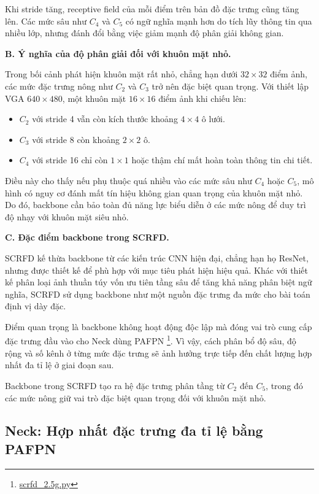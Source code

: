 Khi stride tăng, receptive field của mỗi điểm trên bản đồ đặc trưng cũng tăng lên. 
Các mức sâu như $C_4$ và $C_5$ có ngữ nghĩa mạnh hơn do tích lũy thông tin qua nhiều lớp, nhưng đánh đổi bằng việc giảm mạnh độ phân giải không gian.

\medskip
\noindent\textbf{B. Ý nghĩa của độ phân giải đối với khuôn mặt nhỏ.}

Trong bối cảnh phát hiện khuôn mặt rất nhỏ, chẳng hạn dưới $32 \times 32$ điểm ảnh, các mức đặc trưng nông như $C_2$ và $C_3$ trở nên đặc biệt quan trọng. 
Với thiết lập VGA $640 \times 480$, một khuôn mặt $16 \times 16$ điểm ảnh khi chiếu lên:

\begin{itemize}
  \item $C_2$ với stride 4 vẫn còn kích thước khoảng $4 \times 4$ ô lưới.
  \item $C_3$ với stride 8 còn khoảng $2 \times 2$ ô.
  \item $C_4$ với stride 16 chỉ còn $1 \times 1$ hoặc thậm chí mất hoàn toàn thông tin chi tiết.
\end{itemize}

Điều này cho thấy nếu phụ thuộc quá nhiều vào các mức sâu như $C_4$ hoặc $C_5$, mô hình có nguy cơ đánh mất tín hiệu không gian quan trọng của khuôn mặt nhỏ. 
Do đó, backbone cần bảo toàn đủ năng lực biểu diễn ở các mức nông để duy trì độ nhạy với khuôn mặt siêu nhỏ.

\medskip
\noindent\textbf{C. Đặc điểm backbone trong SCRFD.}

SCRFD kế thừa backbone từ các kiến trúc CNN hiện đại, chẳng hạn họ ResNet, nhưng được thiết kế để phù hợp với mục tiêu phát hiện hiệu quả. 
Khác với thiết kế phân loại ảnh thuần túy vốn ưu tiên tầng sâu để tăng khả năng phân biệt ngữ nghĩa, SCRFD sử dụng backbone như một nguồn đặc trưng đa mức cho bài toán định vị dày đặc.

Điểm quan trọng là backbone không hoạt động độc lập mà đóng vai trò cung cấp đặc trưng đầu vào cho Neck dùng PAFPN \footnote{\href{https://github.com/deepinsight/insightface/blob/master/detection/scrfd/configs/scrfd/scrfd_2.5g.py}{scrfd\_2.5g.py}}. 
Vì vậy, cách phân bổ độ sâu, độ rộng và số kênh ở từng mức đặc trưng sẽ ảnh hưởng trực tiếp đến chất lượng hợp nhất đa tỉ lệ ở giai đoạn sau.

\medskip
\noindent
Backbone trong SCRFD tạo ra hệ đặc trưng phân tầng từ $C_2$ đến $C_5$, trong đó các mức nông giữ vai trò đặc biệt quan trọng đối với khuôn mặt nhỏ.

\subsection{Neck: Hợp nhất đặc trưng đa tỉ lệ bằng PAFPN}

